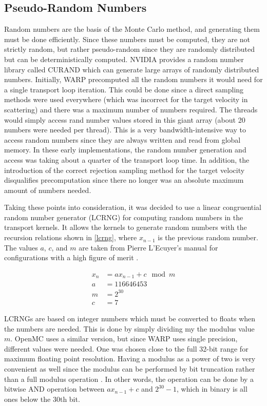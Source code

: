 \subsection{Pseudo-Random Numbers}

Random numbers are the basis of the Monte Carlo method, and generating them must be done efficiently.  Since these numbers must be computed, they are not strictly random, but rather pseudo-random since they are randomly distributed but can be deterministically computed.  NVIDIA provides a random number library called CURAND which can generate large arrays of randomly distributed numbers.  Initially, WARP precomputed all the random numbers it would need for a single transport loop iteration.  This could be done since a direct sampling methods were used everywhere (which was incorrect for the target velocity in scattering) and there was a maximum number of numbers required.  The threads would simply access rand number values stored in this giant array (about 20 numbers were needed per thread).  This is a very bandwidth-intensive way to access random numbers since they are always written and read from global memory.  In these early implementations, the random number generation and access was taking about a quarter of the transport loop time.  In addition, the introduction of the correct rejection sampling method for the target velocity disqualifies precomputation since there no longer was an absolute maximum amount of numbers needed.

Taking these points into consideration, it was decided to use a linear congruential random number generator (LCRNG) for computing random numbers in the transport kernels.  It allows the kernels to generate random numbers with the recursion relations shown in \eqref{lcrng}, where $x_{n-1}$ is the previous random number.  The values $a$, $c$, and $m$ are taken from Pierre L'Ecuyer's manual for configurations with a high figure of merit \cite{lcrng}.   

\begin{equation}
\begin{split}
x_{n} &= a x_{n-1} + c \mod m  \\
a &= 116646453 \\
m &=  2^{30} \\
c &= 7
\end{split}
\label{lcrng}
\end{equation}

LCRNGs are based on integer numbers which must be converted to floats when the numbers are needed.  This is done by simply dividing my the modulus value $m$.  OpenMC uses a similar version, but since WARP uses single precision, different values were needed.   One was chosen close to the full 32-bit range for maximum floating point resolution.  Having a modulus as a power of two is very convenient as well since the modulus can be performed by bit truncation rather than a full modulus operation \cite{openmc}.  In other words, the operation can be done by a bitwise AND operation between $a x_{n-1} + c$ and $2^{30}-1$, which in binary is all ones below the 30th bit.

